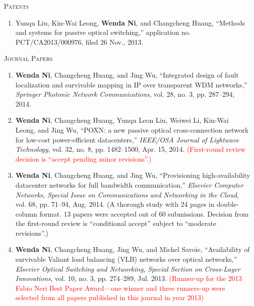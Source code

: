 \documentclass[letterpaper,11pt]{article}
\newcommand{\resheading}[1]{{\noindent\large \colorbox{mygrey}{
\begin{minipage}{1.0\textwidth}{\textsc{#1 \vphantom{p\^{E}}}}\end{minipage}}}}
\begin{document}
\resheading{Patents}%
\begin{enumerate}
\item
Yunqu Liu, Kin-Wai Leong, \textbf{Wenda Ni}, and Changcheng Huang, ``Methods and systems for passive optical switching,'' application no. PCT/CA2013/000976, filed 26 Nov., 2013.


\end{enumerate}



\resheading{Journal Papers}%
\begin{enumerate}

\item
\textbf{Wenda Ni}, Changcheng Huang, and Jing Wu, ``Integrated design of fault localization and survivable mapping in IP over transparent WDM networks,'' \textit{Springer Photonic Network Communications}, vol. 28, no. 3, pp. 287--294, 2014.

\item
\textbf{Wenda Ni}, Changcheng Huang, Yunqu Leon Liu, Weiwei Li, Kin-Wai Leong, and Jing Wu, ``POXN: a new passive optical cross-connection network for low-cost power-efficient datacenters,'' \textit{IEEE/OSA Journal of Lightwave Technology}, vol. 32, no. 8, pp. 1482--1500, Apr. 15, 2014.
\textcolor{Red}{(First-round review decision is ``accept pending minor revisions''.)}

\item
\textbf{Wenda Ni}, Changcheng Huang, and Jing Wu, ``Provisioning high-availability datacenter networks for full bandwidth communication,'' \textit{Elsevier Computer Networks, Special Issue on Communications and Networking in the Cloud}, vol. 68, pp. 71--94, Aug. 2014.
(A thorough study with 24 pages in double-column format. 13 papers were accepted out of 60 submissions. Decision from the first-round review is ``conditional accept'' subject to ``moderate revisions''.)

\item
\textbf{Wenda Ni}, Changcheng Huang, Jing Wu, and Michel Savoie, ``Availability of survivable Valiant load balancing (VLB) networks over optical networks,'' \textit{Elsevier Optical Switching and Networking, Special Section on Cross-Layer Innovations}, vol. 10, no. 3, pp. 274--289, Jul. 2013. \textcolor{Red}{(Runner-up for the 2013 Fabio Neri Best Paper Award---one winner and three runners-up were selected from all papers published in this journal in year 2013)}


\end{enumerate}
\end{document}
